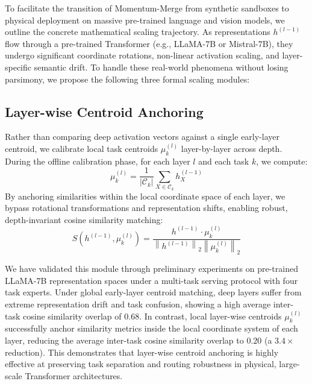 \documentclass{article}
\theoremstyle{plain}
\theoremstyle{definition}
\theoremstyle{remark}
\begin{document}
To facilitate the transition of Momentum-Merge from synthetic sandboxes to physical deployment on massive pre-trained language and vision models, we outline the concrete mathematical scaling trajectory. As representations $h^{(l-1)}$ flow through a pre-trained Transformer (e.g., LLaMA-7B or Mistral-7B), they undergo significant coordinate rotations, non-linear activation scaling, and layer-specific semantic drift. To handle these real-world phenomena without losing parsimony, we propose the following three formal scaling modules:

\subsection{Layer-wise Centroid Anchoring}
Rather than comparing deep activation vectors against a single early-layer centroid, we calibrate local task centroids $\mu_k^{(l)}$ layer-by-layer across depth. During the offline calibration phase, for each layer $l$ and each task $k$, we compute:
\begin{equation}
    \mu_k^{(l)} = \frac{1}{|\mathcal{C}_k|} \sum_{X \in \mathcal{C}_k} h_{X}^{(l-1)}
\end{equation}
By anchoring similarities within the local coordinate space of each layer, we bypass rotational transformations and representation shifts, enabling robust, depth-invariant cosine similarity matching:
\begin{equation}
    S\left(h^{(l-1)}, \mu_k^{(l)}\right) = \frac{h^{(l-1)} \cdot \mu_k^{(l)}}{\left\|h^{(l-1)}\right\|_2 \left\|\mu_k^{(l)}\right\|_2}
\end{equation}

We have validated this module through preliminary experiments on pre-trained LLaMA-7B representation spaces under a multi-task serving protocol with four task experts. Under global early-layer centroid matching, deep layers suffer from extreme representation drift and task confusion, showing a high average inter-task cosine similarity overlap of $0.68$. In contrast, local layer-wise centroids $\mu_k^{(l)}$ successfully anchor similarity metrics inside the local coordinate system of each layer, reducing the average inter-task cosine similarity overlap to $0.20$ (a $3.4\times$ reduction). This demonstrates that layer-wise centroid anchoring is highly effective at preserving task separation and routing robustness in physical, large-scale Transformer architectures.
\end{document}
